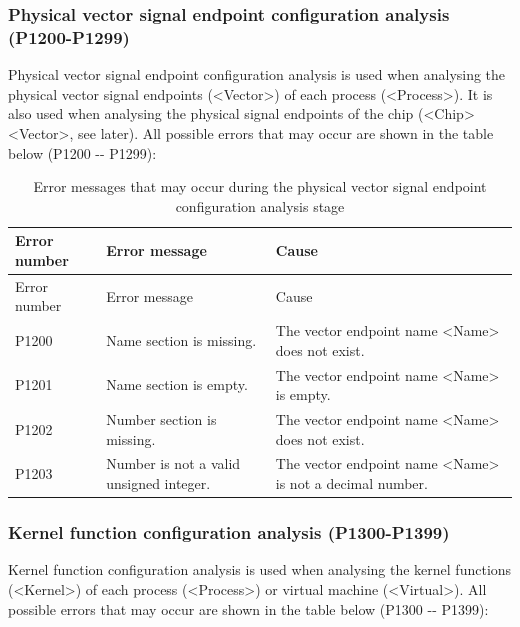 \subsubsection{Physical vector signal endpoint configuration analysis (P1200-P1299)}\label{subsubsec:5-6-2-13}

Physical vector signal endpoint configuration analysis is used when analysing the physical vector signal endpoints (<Vector>) of each process (<Process>). It is also used when analysing the physical signal endpoints of the chip (<Chip><Vector>, see later). All possible errors that may occur are shown in the table below (P1200
-\/- P1299):

\begin{xltabular}{\textwidth}{@{}>{\hsize\raggedright\arraybackslash}X>{\hsize\raggedright\arraybackslash}X>{\hsize\raggedright\arraybackslash}X@{}}
\caption{Error messages that may occur during the physical vector signal endpoint configuration analysis stage}\label{tab:5-15}\\
\toprule
Error number & Error message & Cause\tabularnewline
\endfirsthead
\toprule
Error number & Error message & Cause\tabularnewline
\midrule
\endhead
\bottomrule
\endlastfoot
P1200 & Name section is missing. &
The vector endpoint name <Name> does not exist.\tabularnewline
P1201 & Name section is empty. &
The vector endpoint name <Name> is empty.\tabularnewline
P1202 & Number section is missing. &
The vector endpoint name <Name> does not exist.\tabularnewline
P1203 & Number is not a valid unsigned integer. &
The vector endpoint name <Name> is not a decimal number.\tabularnewline
\end{xltabular}

\subsubsection{Kernel function configuration analysis (P1300-P1399)}\label{subsubsec:5-6-2-14}

Kernel function configuration analysis is used when analysing the kernel functions (<Kernel>) of each process (<Process>) or virtual machine (<Virtual>). All possible errors that may occur are shown in the table below (P1300
-\/- P1399):

